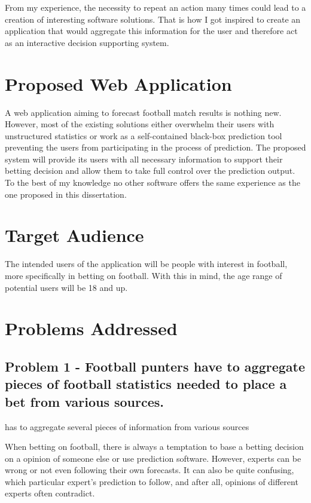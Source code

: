 From my experience, the necessity to repeat an action many times could lead to a creation of interesting software solutions. That is how I got inspired to create an application that would aggregate this information for the user and therefore act as an interactive decision supporting system.

\section{Proposed Web Application}
\label{sec:proposedwebapp_intro}
A web application aiming to forecast football match results is nothing new. However, most of the existing solutions either overwhelm their users with unstructured statistics or work as a self-contained black-box prediction tool preventing the users from participating in the process of prediction. The proposed system will provide its users with all necessary information to support their betting decision and allow them to take full control over the prediction output. To the best of my knowledge no other software offers the same experience as the one proposed in this dissertation.

\section{Target Audience}
\label{sec:targetaudience_intro}
The intended users of the application will be people with interest in football, more specifically in betting on football. With this in mind, the age range of potential users will be 18 and up.

\section{Problems Addressed}
\label{sec:problemsaddressed_intro}

\subsection*{Problem 1 - Football punters have to aggregate pieces of football statistics needed to place a bet from various sources.}
has to aggregate several pieces of information from various sources

When betting on football, there is always a temptation to base a betting decision on a opinion of someone else or use prediction software. However, experts can be wrong or not even following their own forecasts. It can also be quite confusing, which particular expert’s prediction to follow, and after all, opinions of different experts often contradict. 

